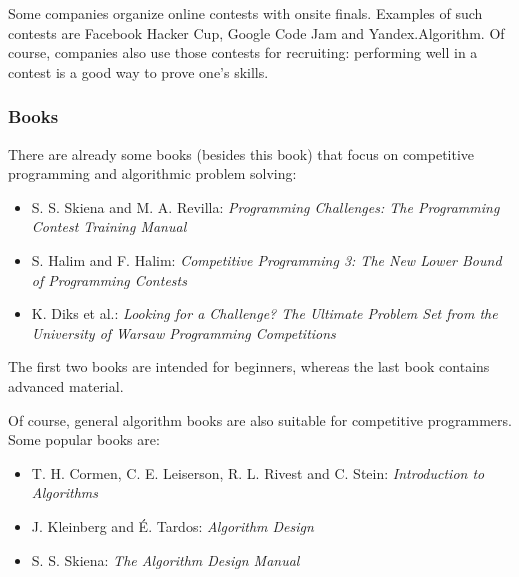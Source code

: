 Some companies organize online contests with onsite finals.
Examples of such contests are Facebook Hacker Cup,
Google Code Jam and Yandex.Algorithm.
Of course, companies also use those contests for recruiting:
performing well in a contest is a good way to prove one's skills.

\subsubsection{Books}

There are already some books (besides this book) that
focus on competitive programming and algorithmic problem solving:

\begin{itemize}
\item S. S. Skiena and M. A. Revilla:
\emph{Programming Challenges: The Programming Contest Training Manual} \cite{ski03}
\item S. Halim and F. Halim:
\emph{Competitive Programming 3: The New Lower Bound of Programming Contests} \cite{hal13}
\item K. Diks et al.: \emph{Looking for a Challenge? The Ultimate Problem Set from
the University of Warsaw Programming Competitions} \cite{dik12}
\end{itemize}

The first two books are intended for beginners,
whereas the last book contains advanced material.

Of course, general algorithm books are also suitable for
competitive programmers.
Some popular books are:

\begin{itemize}
\item T. H. Cormen, C. E. Leiserson, R. L. Rivest and C. Stein:
\emph{Introduction to Algorithms} \cite{cor09}
\item J. Kleinberg and É. Tardos:
\emph{Algorithm Design} \cite{kle05}
\item S. S. Skiena:
\emph{The Algorithm Design Manual} \cite{ski08}
\end{itemize}
